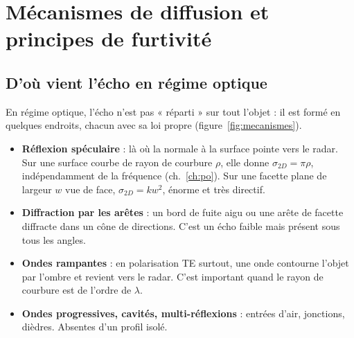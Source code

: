 \chapter{Mécanismes de diffusion et principes de furtivité}\label{ch:mecanismes}

\section{D'où vient l'écho en régime optique}
En régime optique, l'écho n'est pas « réparti » sur tout l'objet : il est formé en quelques endroits, chacun avec sa loi propre (figure~\ref{fig:mecanismes}).
\begin{itemize}
\item \textbf{Réflexion spéculaire} : là où la normale à la surface pointe vers le radar. Sur une surface courbe de rayon de courbure $\rho$, elle donne $\sigma_{2D}=\pi\rho$, indépendamment de la fréquence (ch.~\ref{ch:po}). Sur une facette plane de largeur $w$ vue de face, $\sigma_{2D}=kw^2$, énorme et très directif.
\item \textbf{Diffraction par les arêtes} : un bord de fuite aigu ou une arête de facette diffracte dans un cône de directions. C'est un écho faible mais présent sous tous les angles.
\item \textbf{Ondes rampantes} : en polarisation TE surtout, une onde contourne l'objet par l'ombre et revient vers le radar. C'est important quand le rayon de courbure est de l'ordre de $\lambda$.
\item \textbf{Ondes progressives, cavités, multi-réflexions} : entrées d'air, jonctions, dièdres. Absentes d'un profil isolé.
\end{itemize}


